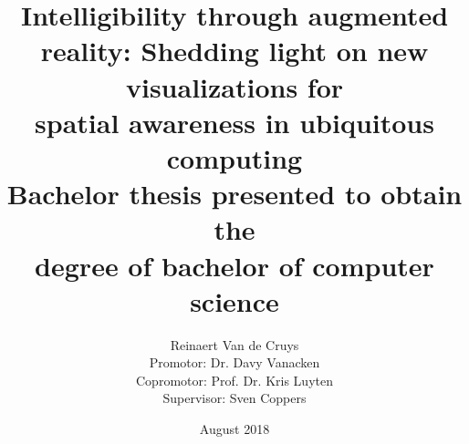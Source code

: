 \documentclass[]{report}
\begin{document}
\title{Intelligibility through augmented reality: Shedding light on new visualizations for \\ spatial awareness in ubiquitous computing \vspace{5mm} \\
\vspace{5mm} \large Bachelor thesis presented to obtain the \\ degree of bachelor of computer science}
\author{Reinaert Van de Cruys \vspace{5mm} \\[15pt]{\footnotesize Promotor: Dr. Davy Vanacken} \\[15pt]{\footnotesize Copromotor: Prof. Dr. Kris Luyten} \\[15pt]{\footnotesize Supervisor: Sven Coppers} \vspace{5mm}}
\date{August 2018}
\maketitle



\tableofcontents








\printbibliography

\appendix



\end{document}

